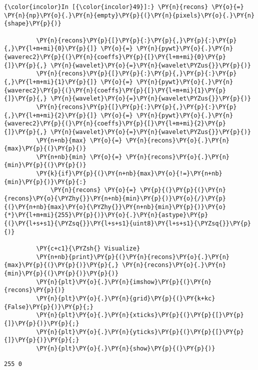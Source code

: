     \begin{Verbatim}[commandchars=\\\{\}]
{\color{incolor}In [{\color{incolor}49}]:} \PY{n}{recons} \PY{o}{=} \PY{n}{np}\PY{o}{.}\PY{n}{empty}\PY{p}{(}\PY{n}{pixels}\PY{o}{.}\PY{n}{shape}\PY{p}{)}
         
         \PY{n}{recons}\PY{p}{[}\PY{p}{:}\PY{p}{,}\PY{p}{:}\PY{p}{,}\PY{l+m+mi}{0}\PY{p}{]} \PY{o}{=} \PY{n}{pywt}\PY{o}{.}\PY{n}{waverec2}\PY{p}{(}\PY{n}{coeffs}\PY{p}{[}\PY{l+m+mi}{0}\PY{p}{]}\PY{p}{,} \PY{n}{wavelet}\PY{o}{=}\PY{n}{wavelet\PYZus{}}\PY{p}{)}
         \PY{n}{recons}\PY{p}{[}\PY{p}{:}\PY{p}{,}\PY{p}{:}\PY{p}{,}\PY{l+m+mi}{1}\PY{p}{]} \PY{o}{=} \PY{n}{pywt}\PY{o}{.}\PY{n}{waverec2}\PY{p}{(}\PY{n}{coeffs}\PY{p}{[}\PY{l+m+mi}{1}\PY{p}{]}\PY{p}{,} \PY{n}{wavelet}\PY{o}{=}\PY{n}{wavelet\PYZus{}}\PY{p}{)}
         \PY{n}{recons}\PY{p}{[}\PY{p}{:}\PY{p}{,}\PY{p}{:}\PY{p}{,}\PY{l+m+mi}{2}\PY{p}{]} \PY{o}{=} \PY{n}{pywt}\PY{o}{.}\PY{n}{waverec2}\PY{p}{(}\PY{n}{coeffs}\PY{p}{[}\PY{l+m+mi}{2}\PY{p}{]}\PY{p}{,} \PY{n}{wavelet}\PY{o}{=}\PY{n}{wavelet\PYZus{}}\PY{p}{)}
         \PY{n+nb}{max} \PY{o}{=} \PY{n}{recons}\PY{o}{.}\PY{n}{max}\PY{p}{(}\PY{p}{)}
         \PY{n+nb}{min} \PY{o}{=} \PY{n}{recons}\PY{o}{.}\PY{n}{min}\PY{p}{(}\PY{p}{)}
         \PY{k}{if}\PY{p}{(}\PY{n+nb}{max}\PY{o}{!=}\PY{n+nb}{min}\PY{p}{)}\PY{p}{:}
             \PY{n}{recons} \PY{o}{=} \PY{p}{(}\PY{p}{(}\PY{n}{recons}\PY{o}{\PYZhy{}}\PY{n+nb}{min}\PY{p}{)}\PY{o}{/}\PY{p}{(}\PY{n+nb}{max}\PY{o}{\PYZhy{}}\PY{n+nb}{min}\PY{p}{)}\PY{o}{*}\PY{l+m+mi}{255}\PY{p}{)}\PY{o}{.}\PY{n}{astype}\PY{p}{(}\PY{l+s+s1}{\PYZsq{}}\PY{l+s+s1}{uint8}\PY{l+s+s1}{\PYZsq{}}\PY{p}{)}
                               
         \PY{c+c1}{\PYZsh{} Visualize}
         \PY{n+nb}{print}\PY{p}{(}\PY{n}{recons}\PY{o}{.}\PY{n}{max}\PY{p}{(}\PY{p}{)}\PY{p}{,} \PY{n}{recons}\PY{o}{.}\PY{n}{min}\PY{p}{(}\PY{p}{)}\PY{p}{)}
         \PY{n}{plt}\PY{o}{.}\PY{n}{imshow}\PY{p}{(}\PY{n}{recons}\PY{p}{)}
         \PY{n}{plt}\PY{o}{.}\PY{n}{grid}\PY{p}{(}\PY{k+kc}{False}\PY{p}{)}\PY{p}{;}
         \PY{n}{plt}\PY{o}{.}\PY{n}{xticks}\PY{p}{(}\PY{p}{[}\PY{p}{]}\PY{p}{)}\PY{p}{;}
         \PY{n}{plt}\PY{o}{.}\PY{n}{yticks}\PY{p}{(}\PY{p}{[}\PY{p}{]}\PY{p}{)}\PY{p}{;}
         \PY{n}{plt}\PY{o}{.}\PY{n}{show}\PY{p}{(}\PY{p}{)}
\end{Verbatim}


    \begin{Verbatim}[commandchars=\\\{\}]
255 0

    \end{Verbatim}

